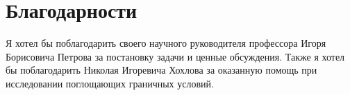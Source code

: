 \documentclass[12pt,a4paper]{article}
\begin{document}
%
\onehalfspacing

\addtocounter{page}{1}


\singlespacing
\tableofcontents
\onehalfspacing

\newpage









\section*{Благодарности}
Я хотел бы поблагодарить своего научного руководителя профессора Игоря Борисовича Петрова за постановку  задачи и ценные обсуждения. Также я хотел бы поблагодарить Николая Игоревича Хохлова за оказанную помощь при исследовании поглощающих граничных условий.

\newpage

\printbibliography[heading=bibintoc]
\end{document}
